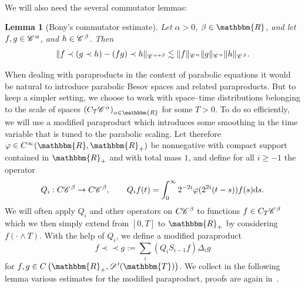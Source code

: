 \documentclass[a4paper,11pt]{article}
\newcommand{\assign}{:=}
\newcommand{\cdummy}{\cdot}
\newcommand{\mathd}{\mathrm{d}}
\newcommand{\precprec}{\prec\!\!\!\prec}
\newtheorem{lemma}[theorem]{Lemma}
{\theorembodyfont{\rmfamily}\newtheorem{remark}[theorem]{Remark}}
\newcommand{\CC}{\mathscr{C} \hspace{.1em}}
\newcommand{\CD}{\mathscr{D} \hspace{.1em}}
\begin{document}
\

We will also need the several commutator lemmas:

\begin{lemma}[Bony's commutator estimate]
  \label{lem:bony commutator}Let $\alpha > 0$, $\beta \in \mathbbm{R}$, and
  let $f, g \in \CC^{\alpha}$, and $h \in \CC^{\beta}$. Then
  \[ \| f \prec (g \prec h) - (f g) \prec h \|_{\CC^{\alpha + \beta}} \lesssim
     \| f \|_{\CC^{\alpha}} \| g \|_{\CC^{\alpha}} \| h \|_{\CC^{\beta}} . \]
\end{lemma}

When dealing with paraproducts in the context of parabolic equations it would
be natural to introduce parabolic Besov spaces and related paraproducts. But
to keep a simpler setting, we choose to work with space--time distributions
belonging to the scale of spaces $\left( C_T \CC^{\alpha} \right)_{\alpha \in
\mathbbm{R}}$ for some $T > 0$. To do so efficiently, we will use a modified
paraproduct which introduces some smoothing in the time variable that is tuned
to the parabolic scaling. Let therefore $\varphi \in C^{\infty} (\mathbbm{R},
\mathbbm{R}_+)$ be nonnegative with compact support contained in
$\mathbbm{R}_+$ and with total mass $1$, and define for all $i \geqslant - 1$
the operator
\[ Q_i : C \CC^{\beta} \rightarrow C \CC^{\beta}, \qquad Q_i f (t) =
   \int_0^{\infty} 2^{- 2 i} \varphi (2^{2 i} (t - s)) f (s) \mathd s. \]
We will often apply $Q_i$ and other operators on $C \CC^{\beta}$ to functions
$f \in C_T \CC^{\beta}$ which we then simply extend from $[0, T]$ to
$\mathbbm{R}_+$ by considering $f (\cdummy \wedge T)$. With the help of $Q_i$,
we define a modified paraproduct
\[ f \precprec g \assign \sum_i (Q_i S_{i - 1} f) \Delta_i g \]
for $f, g \in C \left( \mathbbm{R}_+, \CD' (\mathbbm{T}) \right)$. We collect
in the following lemma various estimates for the modified paraproduct, proofs
are again in~{\cite{gubinelli_kpz_2017}}.
\end{document}
